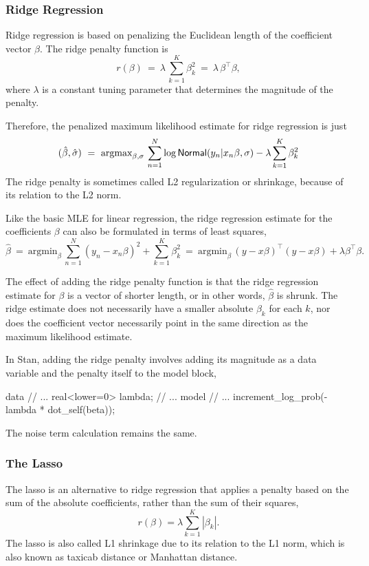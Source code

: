 \subsubsection{Ridge Regression}

Ridge regression \citep{HoerlKennard:1970} is based on penalizing the
Euclidean length of the coefficient vector $\beta$. The ridge penalty
function is
%
\[
r(\beta)
\ = \
\lambda \, \sum_{k=1}^K \beta_k^2
\ = \
\lambda \, \beta^{\top} \beta,
\]
%
where $\lambda$ is a constant tuning parameter that determines the
magnitude of the penalty.


Therefore, the penalized maximum likelihood estimate for ridge
regression is just
%
\[
(\hat{\beta},\hat{\sigma})
\ = \
\mbox{argmax}_{\beta,\sigma} \,
 \sum_{n=1}^N \log \distro{Normal}(y_n|x_n \beta, \sigma) - \lambda
 \sum_{k=1}^K \beta_k^2
\]
%
The ridge penalty is sometimes called L2 regularization or shrinkage,
because of its relation to the L2 norm.

Like the basic MLE for linear regression, the ridge regression
estimate for the coefficients $\beta$ can also be formulated in terms
of least squares,
%
\[
\hat{\beta}
\ = \
\mbox{argmin}_{\beta} \, \sum_{n=1}^N (y_n - x_n \beta)^2 + \sum_{k=1}^K \beta_k^2
\ = \
\mbox{argmin}_{\beta} \, (y - x\beta)^{\top} (y - x\beta) +
\lambda \beta^{\top} \beta.
\]

The effect of adding the ridge penalty function is that the ridge
regression estimate for $\beta$ is a vector of shorter length, or in
other words, $\hat{\beta}$ is shrunk.  The ridge estimate does not
necessarily have a smaller absolute $\beta_k$ for each $k$, nor does
the coefficient vector necessarily point in the same direction as the
maximum likelihood estimate.

In Stan, adding the ridge penalty involves adding its magnitude as a
data variable and the penalty itself to the model block,
%
\begin{stancode}
data {
  // ...
  real<lower=0> lambda;
}
// ...
model {
  // ...
  increment_log_prob(- lambda * dot_self(beta));
}
\end{stancode}
%
The noise term calculation remains the same.

\subsubsection{The Lasso}

The lasso \citep{Tibshirani:1996} is an alternative to ridge
regression that applies a penalty based on the sum of the absolute
coefficients, rather than the sum of their squares,
\[
r(\beta) = \lambda \sum_{k=1}^K | \beta_k |.
\]
The lasso is also called L1 shrinkage due to its relation to the L1
norm, which is also known as taxicab distance or Manhattan distance.

